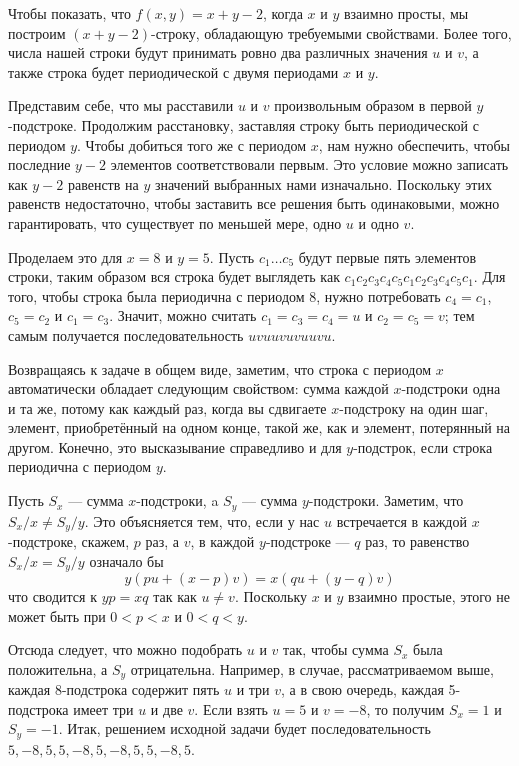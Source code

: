 Чтобы показать, что $f(x,y)=x+y-2$, когда $x$ и $y$ взаимно просты, мы построим $(x+y-2)$-строку, обладающую требуемыми свойствами.
Более того, числа нашей строки будут принимать ровно два различных значения $u$ и $v$,
а также строка будет периодической с двумя периодами $x$ и $y$.

Представим себе, что мы расставили $u$ и $v$ произвольным образом в первой $y$-подстроке.
Продолжим расстановку, заставляя строку быть периодической с периодом $y$.
Чтобы добиться того же с периодом $x$,
нам нужно обеспечить, чтобы последние $y-2$ элементов соответствовали первым.
Это условие можно записать как $y-2$ равенств на $y$ значений выбранных нами изначально.
Поскольку этих равенств недостаточно, чтобы заставить все решения быть одинаковыми, можно гарантировать, что существует по меньшей мере, одно $u$ и одно $v$.

Проделаем это для $x=8$ и $y=5$.
Пусть $c_1\dots c_5$ будут первые пять элементов строки, 
таким образом вся строка будет выглядеть как
$c_1c_2c_3c_4c_5c_1c_2c_3c_4c_5c_1$.
Для того, чтобы строка была периодична с периодом 8, 
нужно потребовать $c_4=c_1$, $c_5=c_2$ и $c_1=c_3$.
Значит, можно считать $c_1=c_3=c_4=u$ и $c_2=c_5=v$; 
тем самым получается последовательность $uvuuvuvuuvu$.

Возвращаясь к задаче в общем виде, 
заметим, что строка с периодом $x$ автоматически обладает следующим свойством: сумма каждой $x$-подстроки одна и та же, потому как каждый раз, когда вы сдвигаете $x$-подстроку на один шаг, элемент, приобретённый на одном конце, такой же, как и элемент, потерянный на другом.
Конечно, это высказывание справедливо и для $y$-подстрок, если строка периодична с периодом $y$.

Пусть $S_x$ --- сумма $x$-подстроки, a $S_y$ --- сумма $y$-подстроки.
Заметим, что $S_x/x\ne S_y/y$.
Это объясняется тем, что, если у нас $u$ встречается в каждой
 $x$-подстроке, скажем, $p$ раз, а $v$, в каждой $y$-подстроке --- $q$ раз, 
 то равенство $S_x/x=S_y/y$
 означало бы 
\[y(pu+(x-p)v)=x(qu+(y-q)v)\]
что сводится к $yp=xq$ так как $u\ne v$.
Поскольку $x$ и $y$ взаимно простые, этого не может быть при $0<p<x$ и $0<q<y$.

Отсюда следует, что можно подобрать $u$ и $v$ так, чтобы сумма $S_x$ была положительна, а $S_y$ отрицательна.
Например, в случае, рассматриваемом выше, каждая 8-подстрока содержит пять $u$ и три $v$, 
а в свою очередь, каждая 5-подстрока имеет три $u$ и две $v$.
Если взять $u=5$ и $v=-8$, то получим $S_x=1$ и $S_y=-1$.
Итак, решением исходной задачи будет последовательность $5,-8,5,5,-8,5,-8,5,5,-8,5$.
\heart

